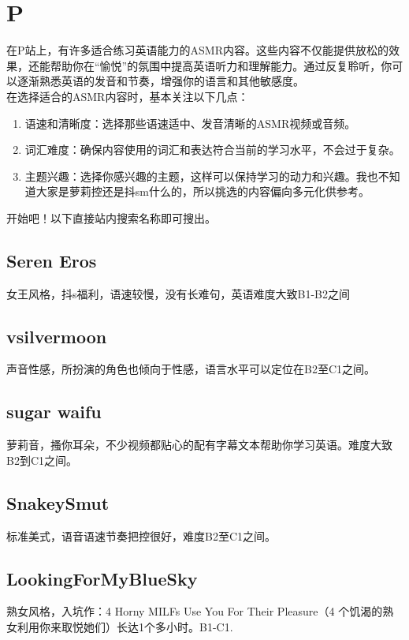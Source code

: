 \documentclass[11pt]{article}
\begin{document}
\section{P}
\label{sec:orge38a327}
在P站上，有许多适合练习英语能力的ASMR内容。这些内容不仅能提供放松的效果，还能帮助你在“愉悦”的氛围中提高英语听力和理解能力。通过反复聆听，你可以逐渐熟悉英语的发音和节奏，增强你的语言和其他敏感度。\\
在选择适合的ASMR内容时，基本关注以下几点：
\begin{enumerate}
\item 语速和清晰度：选择那些语速适中、发音清晰的ASMR视频或音频。
\item 词汇难度：确保内容使用的词汇和表达符合当前的学习水平，不会过于复杂。
\item 主题兴趣：选择你感兴趣的主题，这样可以保持学习的动力和兴趣。我也不知道大家是萝莉控还是抖sm什么的，所以挑选的内容偏向多元化供参考。
\end{enumerate}
开始吧！以下直接站内搜索名称即可搜出。
\subsection{Seren Eros}
\label{sec:orgfab5634}
女王风格，抖s福利，语速较慢，没有长难句，英语难度大致B1-B2之间

\subsection{vsilvermoon}
\label{sec:orgf5301e8}
声音性感，所扮演的角色也倾向于性感，语言水平可以定位在B2至C1之间。

\subsection{sugar waifu}
\label{sec:org0e0242e}
萝莉音，搔你耳朵，不少视频都贴心的配有字幕文本帮助你学习英语。难度大致B2到C1之间。

\subsection{SnakeySmut}
\label{sec:org466bab7}
标准美式，语音语速节奏把控很好，难度B2至C1之间。

\subsection{LookingForMyBlueSky}
\label{sec:orgf34f50e}
熟女风格，入坑作：4 Horny MILFs Use You For Their Pleasure（4 个饥渴的熟女利用你来取悦她们）长达1个多小时。B1-C1.
\end{document}

